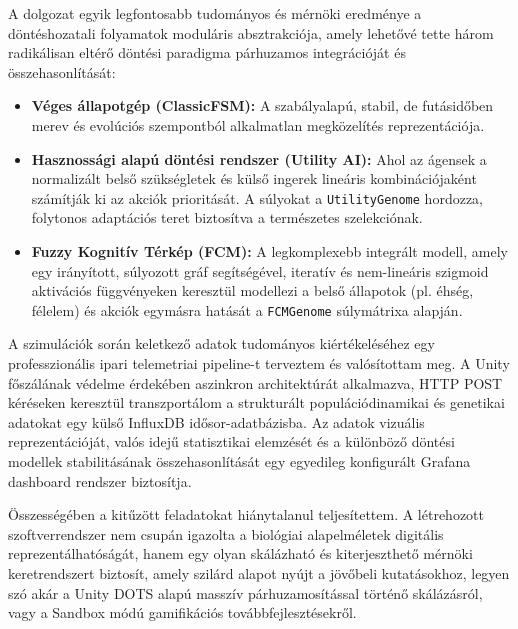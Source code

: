 A dolgozat egyik legfontosabb tudományos és mérnöki eredménye a döntéshozatali folyamatok moduláris absztrakciója, amely lehetővé tette három radikálisan eltérő döntési paradigma párhuzamos integrációját és összehasonlítását:
\begin{itemize}
    \item \textbf{Véges állapotgép (ClassicFSM):} A szabályalapú, stabil, de futásidőben merev és evolúciós szempontból alkalmatlan megközelítés reprezentációja.
    \item \textbf{Hasznossági alapú döntési rendszer (Utility AI):} Ahol az ágensek a normalizált belső szükségletek és külső ingerek lineáris kombinációjaként számítják ki az akciók prioritását. A súlyokat a \texttt{UtilityGenome} hordozza, folytonos adaptációs teret biztosítva a természetes szelekciónak.
    \item \textbf{Fuzzy Kognitív Térkép (FCM):} A legkomplexebb integrált modell, amely egy irányított, súlyozott gráf segítségével, iteratív és nem-lineáris szigmoid aktivációs függvényeken keresztül modellezi a belső állapotok (pl. éhség, félelem) és akciók egymásra hatását a \texttt{FCMGenome} súlymátrixa alapján.
\end{itemize}

A szimulációk során keletkező adatok tudományos kiértékeléséhez egy professzionális ipari telemetriai pipeline-t terveztem és valósítottam meg. A Unity főszálának védelme érdekében aszinkron architektúrát alkalmazva, HTTP POST kéréseken keresztül transzportálom a strukturált populációdinamikai és genetikai adatokat egy külső InfluxDB idősor-adatbázisba. Az adatok vizuális reprezentációját, valós idejű statisztikai elemzését és a különböző döntési modellek stabilitásának összehasonlítását egy egyedileg konfigurált Grafana dashboard rendszer biztosítja.

Összességében a kitűzött feladatokat hiánytalanul teljesítettem. A létrehozott szoftverrendszer nem csupán igazolta a biológiai alapelméletek digitális reprezentálhatóságát, hanem egy olyan skálázható és kiterjeszthető mérnöki keretrendszert biztosít, amely szilárd alapot nyújt a jövőbeli kutatásokhoz, legyen szó akár a Unity DOTS alapú masszív párhuzamosítással történő skálázásról, vagy a Sandbox módú gamifikációs továbbfejlesztésekről.
